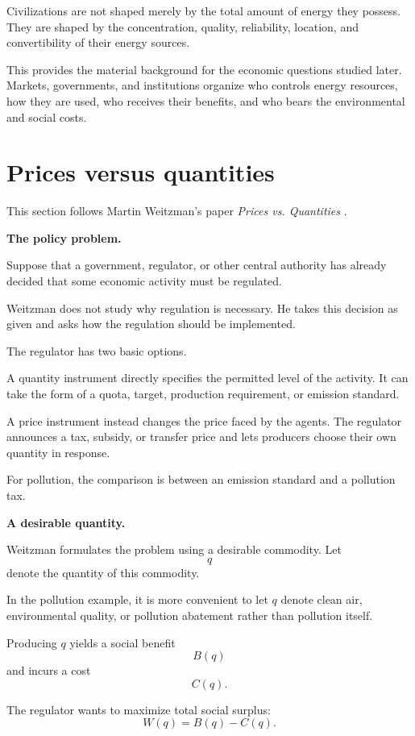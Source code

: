 Civilizations are not shaped merely by the
total amount of energy they possess. They
are shaped by the concentration, quality,
reliability, location, and convertibility
of their energy sources.

This provides the material background for
the economic questions studied later.
Markets, governments, and institutions
organize who controls energy resources,
how they are used, who receives their
benefits, and who bears the environmental
and social costs.


\section{Prices versus quantities}
\label{section-prices-quantities}

\noindent
This section follows Martin Weitzman's
paper \emph{Prices vs. Quantities}
\cite{weitzman1974prices}.

\medskip\noindent
{\bf The policy problem.}

Suppose that a government, regulator, or
other central authority has already decided
that some economic activity must be
regulated.

Weitzman does not study why regulation is
necessary. He takes this decision as given
and asks how the regulation should be
implemented.

The regulator has two basic options.

A quantity instrument directly specifies
the permitted level of the activity. It can
take the form of a quota, target, production
requirement, or emission standard.

A price instrument instead changes the
price faced by the agents. The regulator
announces a tax, subsidy, or transfer price
and lets producers choose their own
quantity in response.

For pollution, the comparison is between
an emission standard and a pollution tax.

\medskip\noindent
{\bf A desirable quantity.}

Weitzman formulates the problem using a
desirable commodity. Let
\[
  q
\]
denote the quantity of this commodity.

In the pollution example, it is more
convenient to let $q$ denote clean air,
environmental quality, or pollution
abatement rather than pollution itself.

Producing $q$ yields a social benefit
\[
  B(q)
\]
and incurs a cost
\[
  C(q).
\]

The regulator wants to maximize total
social surplus:
\[
  W(q)=B(q)-C(q).
\]

